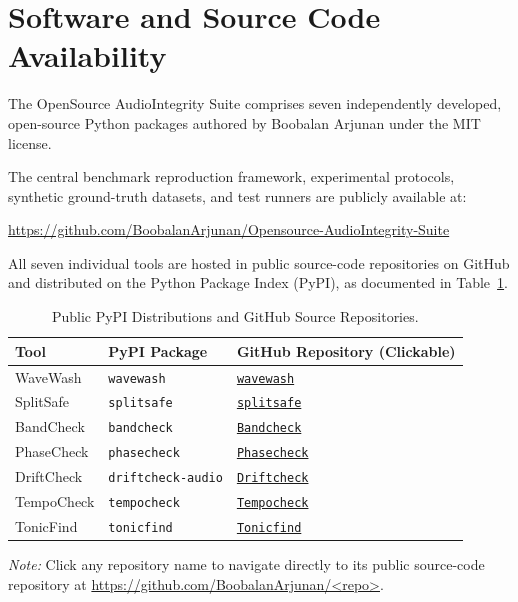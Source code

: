 \documentclass[10pt,journal,compsoc]{IEEEtran}
\begin{document}
\section*{Software and Source Code Availability}
The OpenSource AudioIntegrity Suite comprises seven independently developed, open-source Python packages authored by Boobalan Arjunan under the MIT license.

The central benchmark reproduction framework, experimental protocols, synthetic ground-truth datasets, and test runners are publicly available at:
\begin{center}
\url{https://github.com/BoobalanArjunan/Opensource-AudioIntegrity-Suite}
\end{center}

All seven individual tools are hosted in public source-code repositories on GitHub and distributed on the Python Package Index (PyPI), as documented in Table~\ref{tab:repo_inventory}.

\begin{table}[h]
\centering
\caption{Public PyPI Distributions and GitHub Source Repositories.}
\label{tab:repo_inventory}
\footnotesize
\renewcommand{\arraystretch}{1.18}
\begin{tabular*}{\columnwidth}{@{\extracolsep{\fill}}lll@{}}
\toprule
\textbf{Tool} & \textbf{PyPI Package} & \textbf{GitHub Repository (Clickable)} \\
\midrule
WaveWash & \texttt{wavewash} & \href{https://github.com/BoobalanArjunan/wavewash}{\texttt{wavewash}} \\
SplitSafe & \texttt{splitsafe} & \href{https://github.com/BoobalanArjunan/splitsafe}{\texttt{splitsafe}} \\
BandCheck & \texttt{bandcheck} & \href{https://github.com/BoobalanArjunan/Bandcheck}{\texttt{Bandcheck}} \\
PhaseCheck & \texttt{phasecheck} & \href{https://github.com/BoobalanArjunan/Phasecheck}{\texttt{Phasecheck}} \\
DriftCheck & \texttt{driftcheck-audio} & \href{https://github.com/BoobalanArjunan/Driftcheck}{\texttt{Driftcheck}} \\
TempoCheck & \texttt{tempocheck} & \href{https://github.com/BoobalanArjunan/Tempocheck}{\texttt{Tempocheck}} \\
TonicFind & \texttt{tonicfind} & \href{https://github.com/BoobalanArjunan/Tonicfind}{\texttt{Tonicfind}} \\
\bottomrule
\end{tabular*}
\vspace{1mm}
\begin{minipage}{\columnwidth}
\scriptsize \textit{Note:} Click any repository name to navigate directly to its public source-code repository at \url{https://github.com/BoobalanArjunan/<repo>}.
\end{minipage}
\end{table}
\end{document}
